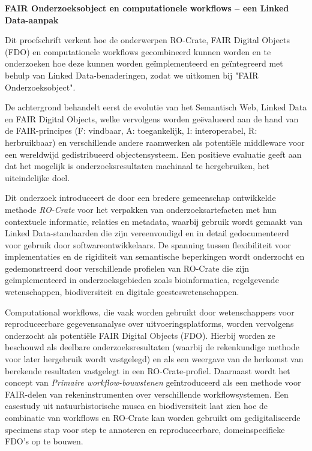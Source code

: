 \textbf{FAIR Onderzoeksobject en computationele workflows – een Linked Data-aanpak}
\label{summarynl}

\begin{small}

Dit proefschrift verkent hoe de onderwerpen RO-Crate, FAIR Digital Objects (FDO) en computationele workflows gecombineerd kunnen worden en te onderzoeken hoe deze kunnen worden geïmplementeerd en geïntegreerd met behulp van Linked Data-benaderingen, zodat we uitkomen bij "FAIR Onderzoeksobject".

De achtergrond behandelt eerst de evolutie van het Semantisch Web, Linked Data en FAIR Digital Objects, welke vervolgens worden geëvalueerd aan de hand van de FAIR-principes (F: vindbaar, A: toegankelijk, I: interoperabel, R: herbruikbaar) en verschillende andere raamwerken als potentiële middleware voor een wereldwijd gedistribueerd objectensysteem. Een positieve evaluatie geeft aan dat het mogelijk is onderzoeksresultaten machinaal te hergebruiken, het uiteindelijke doel.

Dit onderzoek introduceert de door een bredere gemeenschap ontwikkelde methode \emph{RO-Crate} voor het verpakken van onderzoeksartefacten met hun contextuele informatie, relaties en metadata, waarbij gebruik wordt gemaakt van Linked Data-standaarden die zijn vereenvoudigd en in detail gedocumenteerd voor gebruik door softwareontwikkelaars. De spanning tussen flexibiliteit voor implementaties en de rigiditeit van semantische beperkingen wordt onderzocht en gedemonstreerd door verschillende profielen van RO-Crate die zijn geïmplementeerd in onderzoeksgebieden zoals bioinformatica, regelgevende wetenschappen, biodiversiteit en digitale geesteswetenschappen.

Computational workflows, die vaak worden gebruikt door wetenschappers voor reproduceerbare gegevensanalyse over uitvoeringsplatforms, worden vervolgens onderzocht als potentiële FAIR Digital Objects (FDO). Hierbij worden ze beschouwd als deelbare onderzoeksresultaten (waarbij de rekenkundige methode voor later hergebruik wordt vastgelegd) en als een weergave van de herkomst van berekende resultaten vastgelegt in een RO-Crate-profiel. Daarnaast wordt het concept van \emph{Primaire workflow-bouwstenen} geïntroduceerd als een methode voor FAIR-delen van rekeninstrumenten over verschillende workflowsystemen. Een casestudy uit natuurhistorische musea en biodiversiteit laat zien hoe de combinatie van workflows en RO-Crate kan worden gebruikt om gedigitaliseerde specimens stap voor step te annoteren en reproduceerbare, domeinspecifieke FDO's op te bouwen.


\end{small}
